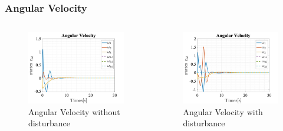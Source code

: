 \documentclass{beamer}
\begin{document}
\begin{frame}
    \frametitle{Angular Velocity}


    \begin{columns}

        \begin{figure}[h]
            \centering
            \includegraphics[width=1\textwidth]{Angular_Velociy_T_Servo.jpg}
            \caption{Angular Velocity without disturbance}
        \end{figure}

        \begin{figure}[h]
            \centering
            \includegraphics[width=1\textwidth]{Angular_Velociy_T_Servo_Dist.jpg}
            \caption{Angular Velocity with disturbance}
        \end{figure}
    \end{columns}

\end{frame}
\end{document}
